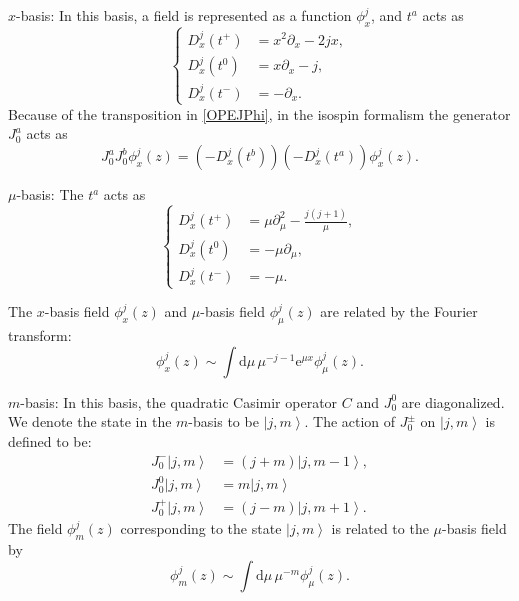 \documentclass[10pt,a4paper]{article}
\numberwithin{equation}{section}
\newcommand{\ket}[1]{\left| #1 \right\rangle}
\begin{document}
$x$-basis: In this basis, a field is represented as a function $\phi^{j}_{x}$, and $t^{a}$ acts as 
\begin{equation}
    \left\{
        \begin{aligned}
            D^{j}_{x}(t^{+}) &= x^{2} \partial_{x} - 2 j x, \\
            D^{j}_{x}(t^{0}) &= x \partial_{x} - j, \\
            D^{j}_{x}(t^{-}) &= - \partial_{x}.
        \end{aligned}
    \right. \label{Diffx}
\end{equation}
Because of the transposition in \eqref{OPEJPhi}, in the isospin formalism the generator $J^{a}_{0}$ acts as 
\begin{equation}
    J^{a}_{0} J^{b}_{0} \phi^{j}_{x}(z) = \left( -D^{j}_{x}\left(t^{b}\right) \right) \left( -D^{j}_{x}\left(t^{a}\right) \right) \phi^{j}_{x}(z).
\end{equation}

$\mu$-basis: The $t^{a}$ acts as 
\begin{equation}
    \left\{
        \begin{aligned}
            D^{j}_{x}(t^{+}) &= \mu \partial_{\mu}^{2} - \frac{j(j+1)}{\mu}, \\
            D^{j}_{x}(t^{0}) &= -\mu \partial_{\mu}, \\
            D^{j}_{x}(t^{-}) &= -\mu.
        \end{aligned}
    \right. \label{Diffmu}
\end{equation}

The $x$-basis field $\phi^{j}_{x}(z)$ and $\mu$-basis field $\phi^{j}_{\mu}(z)$ are related by the Fourier transform: 
\begin{equation}
    \phi^{j}_{x}(z) \sim \int \mathrm{d} \mu \, \mu^{-j-1} \mathrm{e}^{\mu x} \phi^{j}_{\mu}(z).
\end{equation}

$m$-basis: In this basis, the quadratic Casimir operator $C$ and $J^{0}_{0}$ are diagonalized. We denote the 
state in the $m$-basis to be $\ket{j,m}$. The action of 
$J^{\pm}_{0}$ on $\ket{j,m}$ is defined to be:
\begin{equation}
    \begin{aligned}
        J^{-}_{0} \ket{j,m} &= (j+m)\ket{j,m-1}, \\
        J^{0}_{0} \ket{j,m} &= m \ket{j,m} \\
        J^{+}_{0} \ket{j,m} &= (j-m)\ket{j,m+1}. \label{Jpm}
    \end{aligned}
\end{equation}
The field $\phi^{j}_{m}(z)$ corresponding to the state $\ket{j,m}$ is related to the $\mu$-basis field by 
\begin{equation}
    \phi^{j}_{m}(z) \sim \int \mathrm{d} \mu \, \mu^{-m} \phi^{j}_{\mu}(z).
\end{equation}
\end{document}
